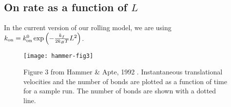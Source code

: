 \documentclass{article}
\newcommand{\tn}{\textnormal}
\begin{document}
\subsection{On rate as a function of $L$}
\label{sec:on-rate-fn}


In the current version of our rolling model, we are using $k_\tn{on} =
\onConst \exp \left(-\frac{\stiffness}{2\boltzmann\temp}
  \length^2\right)$. 

\begin{figure}
  \centering
  \texttt{[image: hammer-fig3]}
  \caption{Figure 3 from Hammer \& Apte, 1992 \cite{Hammer1992}. Instantaneous
    translational velocities and the number of bonds are
    plotted as a function of time for a sample run. The number of
    bonds are shown with a dotted line.}
  \label{fig:hammer-apte}
\end{figure}







\end{document}
